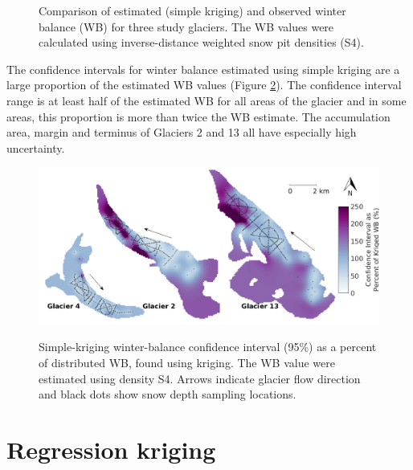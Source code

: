 \documentclass{sfuthesis}
\newcommand{\topomap}{Arrows indicate glacier flow direction and black dots show snow depth sampling locations. }
\begin{document}
\begin{figure}
	\caption{Comparison of estimated (simple kriging) and observed winter balance (WB) for three study glaciers. The WB values were calculated using inverse-distance weighted snow pit densities (S4).}
	\label{fig:R2simplekrig}
\end{figure}

The confidence intervals for winter balance estimated using simple kriging are a large proportion of the estimated WB values (Figure \ref{fig:krigingCI_percent}). The confidence interval range is at least half of the estimated WB for all areas of the glacier and in some areas, this proportion is more than twice the WB estimate. The accumulation area, margin and terminus of Glaciers 2 and 13 all have especially high uncertainty. 

\begin{figure}
	\centering
	\includegraphics[width = \textwidth]{KrigingCI_percent.png}\\
	\caption{Simple-kriging winter-balance confidence interval (95\%) as a percent of distributed WB, found using kriging. The WB value were estimated using density S4. \topomap}
	\label{fig:krigingCI_percent}
\end{figure}

\section{Regression kriging}
\label{sec:regressionkriging}
\end{document}
